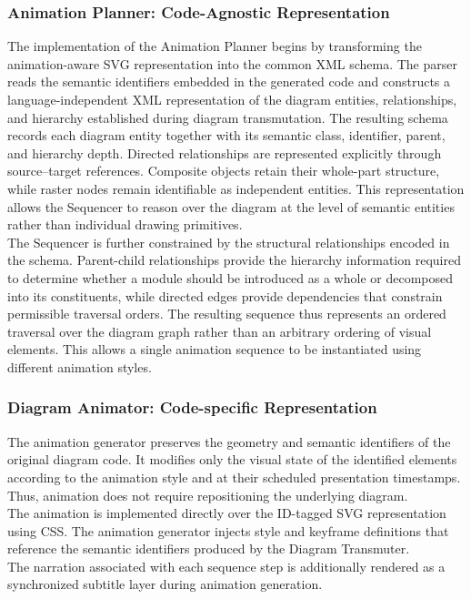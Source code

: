 \documentclass{article} %
\begin{document}
 \subsubsection{Animation Planner: Code-Agnostic Representation}
 The implementation of the Animation Planner begins by transforming the animation-aware SVG representation into the common XML schema. The parser reads the semantic identifiers embedded in the generated code and constructs a language-independent XML representation of the diagram entities, relationships, and hierarchy established during diagram transmutation. The resulting schema records each diagram entity together with its semantic class, identifier, parent, and hierarchy depth. Directed relationships are represented explicitly through source--target references. Composite objects retain their whole-part structure, while raster nodes remain identifiable as independent entities. This representation allows the Sequencer to reason over the diagram at the level of semantic entities rather than individual drawing primitives.\\

 The Sequencer is further constrained by the structural relationships encoded in the schema. Parent-child relationships provide the hierarchy information required to determine whether a module should be introduced as a whole or decomposed into its constituents, while directed edges provide dependencies that constrain permissible traversal orders. The resulting sequence thus represents an ordered traversal over the diagram graph rather than an arbitrary ordering of visual elements. This allows a single animation sequence to be instantiated using different animation styles.

\subsubsection{Diagram Animator: Code-specific Representation}
The animation generator preserves the geometry and semantic identifiers of the original diagram code. It modifies only the visual state of the identified elements according to the animation style and at their scheduled presentation timestamps. Thus, animation does not require repositioning the underlying diagram.\\
The animation is implemented directly over the ID-tagged SVG representation using CSS. The animation generator injects style and keyframe definitions that reference the semantic identifiers produced by the Diagram Transmuter.\\ The narration associated with each sequence step is additionally rendered as a synchronized subtitle layer during animation generation.\\
\end{document}
